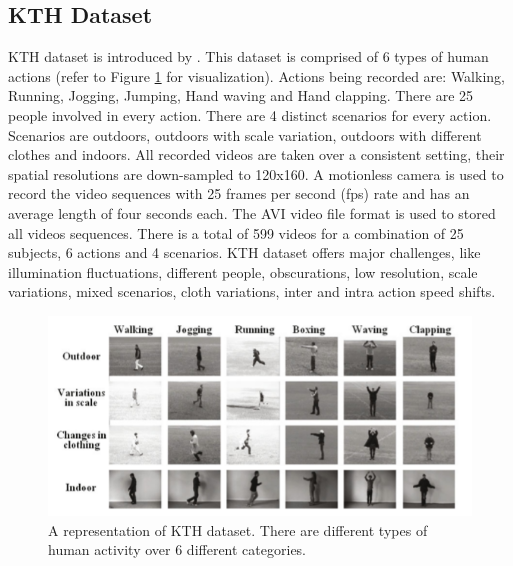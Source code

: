 \documentclass{vldb}
\begin{document}
\subsection{KTH Dataset}
KTH dataset is introduced by \cite{laptev2004recognizing}. This dataset is comprised of 6 types of human actions (refer to Figure \ref{fig:KTHdataset} for visualization). Actions being recorded are: Walking, Running, Jogging, Jumping, Hand waving and Hand clapping. There are 25 people involved in every action. There are 4 distinct scenarios for every action. Scenarios are outdoors, outdoors with scale variation, outdoors with different clothes and indoors. All recorded videos are taken over a consistent setting, their spatial resolutions are down-sampled to 120x160. A motionless camera is used to record the video sequences with 25 frames per second (fps) rate and has an average length of four seconds each. The AVI video file format is used to stored all videos sequences. There is a total of 599 videos for a combination of 25 subjects, 6 actions and 4 scenarios. KTH dataset offers major challenges, like illumination fluctuations, different people, obscurations, low resolution, scale variations, mixed scenarios, cloth variations, inter and intra action speed shifts.\\
\newline
\begin{figure}
\centering
\includegraphics[width=0.95\columnwidth]{photo/data_type}
\caption{A representation of KTH dataset. There are different types of human activity over 6 different categories.}
\label{fig:KTHdataset}
\end{figure}
\end{document}
